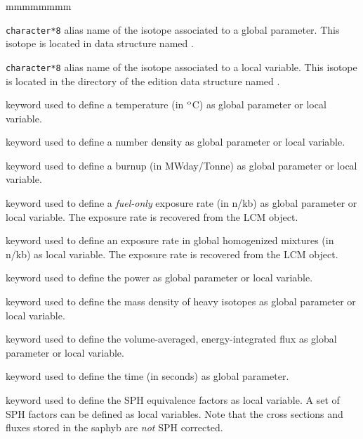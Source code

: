 \begin{ListeDeDescription}{mmmmmmmm}
\item[\dusa{isonam1}] {\tt character*8} alias name of the isotope associated to a global
parameter. This isotope is located in  data structure named .

\item[\dusa{isonam2}] {\tt character*8} alias name of the isotope associated to a local
variable. This isotope is located in the  directory of the {\sc edition}
data structure named .

\item[\moc{TEMP}] keyword used to define a temperature (in $^{\rm o}$C) as global parameter or
local variable.

\item[\moc{CONC}] keyword used to define a number density as global parameter or
local variable.

\item[\moc{IRRA}] keyword used to define a burnup (in MWday/Tonne) as global
parameter or local variable.

\item[\moc{FLUB}] keyword used to define a {\sl fuel-only} exposure rate (in n/kb) as global
parameter or local variable. The exposure rate is recovered from the 
LCM object.

\item[\moc{FLUG}] keyword used to define an exposure rate in global homogenized mixtures (in n/kb) as
local variable. The exposure rate is recovered from the 
LCM object.

\item[\moc{PUIS}] keyword used to define the power as global parameter or
local variable.

\item[\moc{MASL}] keyword used to define the mass density of heavy isotopes as
global parameter or local variable.

\item[\moc{FLUX}] keyword used to define the volume-averaged, energy-integrated flux as
global parameter or local variable.

\item[\moc{TIME}] keyword used to define the time (in seconds) as global parameter.

\item[\moc{EQUI}] keyword used to define the SPH equivalence factors as
local variable. A set of SPH factors can be defined as local
variables. Note that the cross sections and fluxes stored in the {\sc saphyb} are
{\sl not} SPH corrected.


\end{ListeDeDescription}
